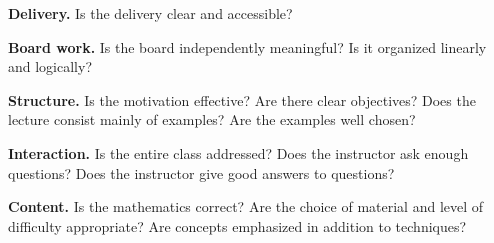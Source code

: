 \documentclass[10pt]{article}
\begin{document}
{\bf Delivery.} Is the delivery clear and accessible?

\vspace{10em}

{\bf Board work.} Is the board independently meaningful? Is it organized linearly and logically?

\vspace{10em}

{\bf Structure.} Is the motivation effective? Are there clear objectives? Does the lecture consist mainly of examples? Are the examples well chosen? 

\vspace{10em}

{\bf Interaction.} Is the entire class addressed? Does the instructor ask enough questions? Does the instructor give good answers to questions?

\vspace{10em} 


{\bf Content.} Is the mathematics correct? Are the choice of material and level of difficulty appropriate? Are concepts emphasized in addition to techniques?
\end{document}
